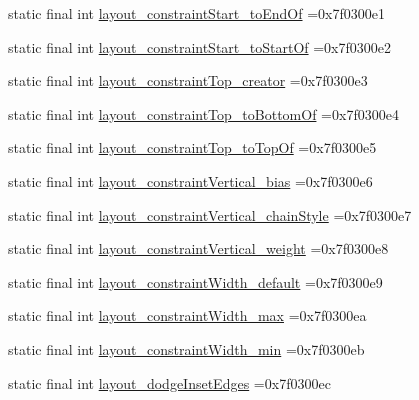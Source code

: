 \begin{DoxyCompactItemize}
\item 
static final int \mbox{\hyperlink{classbr_1_1unb_1_1cic_1_1mp_1_1marketmaster_1_1R_1_1attr_af6efea8439a698dc759f15c09ae54aea}{layout\+\_\+constraint\+Start\+\_\+to\+End\+Of}} =0x7f0300e1
\item 
static final int \mbox{\hyperlink{classbr_1_1unb_1_1cic_1_1mp_1_1marketmaster_1_1R_1_1attr_a47c5b0a50943d20863ae6e8cbea46df5}{layout\+\_\+constraint\+Start\+\_\+to\+Start\+Of}} =0x7f0300e2
\item 
static final int \mbox{\hyperlink{classbr_1_1unb_1_1cic_1_1mp_1_1marketmaster_1_1R_1_1attr_a77dee02c72abf011a620c6d1001950eb}{layout\+\_\+constraint\+Top\+\_\+creator}} =0x7f0300e3
\item 
static final int \mbox{\hyperlink{classbr_1_1unb_1_1cic_1_1mp_1_1marketmaster_1_1R_1_1attr_a71861e794671cd0b76b2ba925c9b39fc}{layout\+\_\+constraint\+Top\+\_\+to\+Bottom\+Of}} =0x7f0300e4
\item 
static final int \mbox{\hyperlink{classbr_1_1unb_1_1cic_1_1mp_1_1marketmaster_1_1R_1_1attr_ab6aab9ccaa4d97fbe0da838e5e0a1c28}{layout\+\_\+constraint\+Top\+\_\+to\+Top\+Of}} =0x7f0300e5
\item 
static final int \mbox{\hyperlink{classbr_1_1unb_1_1cic_1_1mp_1_1marketmaster_1_1R_1_1attr_aed1552435a82358218e9a54396ba0966}{layout\+\_\+constraint\+Vertical\+\_\+bias}} =0x7f0300e6
\item 
static final int \mbox{\hyperlink{classbr_1_1unb_1_1cic_1_1mp_1_1marketmaster_1_1R_1_1attr_a53081b4cafd8fa36f9af17a1afb530a5}{layout\+\_\+constraint\+Vertical\+\_\+chain\+Style}} =0x7f0300e7
\item 
static final int \mbox{\hyperlink{classbr_1_1unb_1_1cic_1_1mp_1_1marketmaster_1_1R_1_1attr_ac6845f0ed18e14d56129d259bc25ecd3}{layout\+\_\+constraint\+Vertical\+\_\+weight}} =0x7f0300e8
\item 
static final int \mbox{\hyperlink{classbr_1_1unb_1_1cic_1_1mp_1_1marketmaster_1_1R_1_1attr_a2f944ec863db9c09d8ebf150800af38a}{layout\+\_\+constraint\+Width\+\_\+default}} =0x7f0300e9
\item 
static final int \mbox{\hyperlink{classbr_1_1unb_1_1cic_1_1mp_1_1marketmaster_1_1R_1_1attr_a1506e2750421829158d832725b7a9b26}{layout\+\_\+constraint\+Width\+\_\+max}} =0x7f0300ea
\item 
static final int \mbox{\hyperlink{classbr_1_1unb_1_1cic_1_1mp_1_1marketmaster_1_1R_1_1attr_a230f28b5e20ffd6a6d2fa868e9a48d07}{layout\+\_\+constraint\+Width\+\_\+min}} =0x7f0300eb
\item 
static final int \mbox{\hyperlink{classbr_1_1unb_1_1cic_1_1mp_1_1marketmaster_1_1R_1_1attr_a19ba64bde852d0ab0f3c315a4448eefa}{layout\+\_\+dodge\+Inset\+Edges}} =0x7f0300ec

\end{DoxyCompactItemize}
